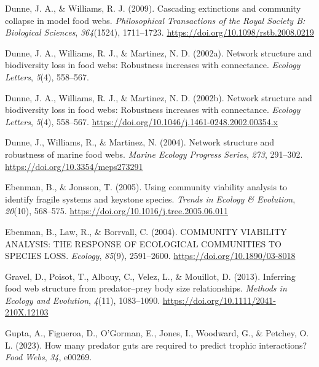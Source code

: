 \documentclass{article}
\newlength{\cslhangindent}
\newlength{\cslentryspacingunit} %
\newenvironment{CSLReferences}[2] %
 {%
  \setlength{\parindent}{0pt}
  \ifodd #1
  \let\oldpar\par
  \def\par{\hangindent=\cslhangindent\oldpar}
  \fi
  \setlength{\parskip}{#2\cslentryspacingunit}
 }%
 {}
\begin{document}
\begin{CSLReferences}{1}{0}
\leavevmode{}%
Dunne, J. A., \& Williams, R. J. (2009). Cascading extinctions and
community collapse in model food webs. \emph{Philosophical Transactions
of the Royal Society B: Biological Sciences}, \emph{364}(1524),
1711--1723. \url{https://doi.org/10.1098/rstb.2008.0219}

\leavevmode{}%
Dunne, J. A., Williams, R. J., \& Martinez, N. D. (2002a). Network
structure and biodiversity loss in food webs: Robustness increases with
connectance. \emph{Ecology Letters}, \emph{5}(4), 558--567.

\leavevmode{}%
Dunne, J. A., Williams, R. J., \& Martinez, N. D. (2002b). Network
structure and biodiversity loss in food webs: Robustness increases with
connectance. \emph{Ecology Letters}, \emph{5}(4), 558--567.
\url{https://doi.org/10.1046/j.1461-0248.2002.00354.x}

\leavevmode{}%
Dunne, J., Williams, R., \& Martinez, N. (2004). Network structure and
robustness of marine food webs. \emph{Marine Ecology Progress Series},
\emph{273}, 291--302. \url{https://doi.org/10.3354/meps273291}

\leavevmode{}%
Ebenman, B., \& Jonsson, T. (2005). Using community viability analysis
to identify fragile systems and keystone species. \emph{Trends in
Ecology \& Evolution}, \emph{20}(10), 568--575.
\url{https://doi.org/10.1016/j.tree.2005.06.011}

\leavevmode{}%
Ebenman, B., Law, R., \& Borrvall, C. (2004). {COMMUNITY VIABILITY
ANALYSIS}: {THE RESPONSE OF ECOLOGICAL COMMUNITIES TO SPECIES LOSS}.
\emph{Ecology}, \emph{85}(9), 2591--2600.
\url{https://doi.org/10.1890/03-8018}

\leavevmode{}%
Gravel, D., Poisot, T., Albouy, C., Velez, L., \& Mouillot, D. (2013).
Inferring food web structure from predator--prey body size
relationships. \emph{Methods in Ecology and Evolution}, \emph{4}(11),
1083--1090. \url{https://doi.org/10.1111/2041-210X.12103}

\leavevmode{}%
Gupta, A., Figueroa, D., O'Gorman, E., Jones, I., Woodward, G., \&
Petchey, O. L. (2023). How many predator guts are required to predict
trophic interactions? \emph{Food Webs}, \emph{34}, e00269.


\end{CSLReferences}
\end{document}
